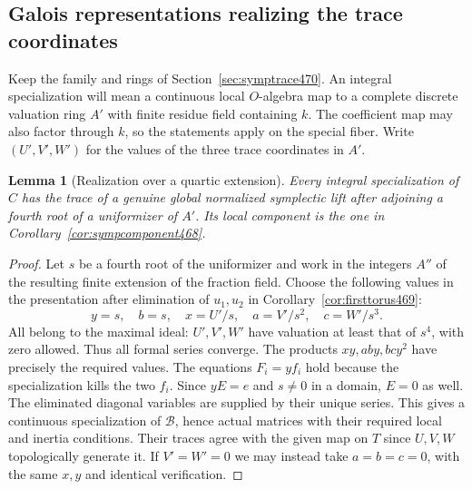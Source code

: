 \documentclass[a4paper,11pt]{article}
\newtheorem{lemma}[proposition]{Lemma}
\theoremstyle{definition}
\theoremstyle{remark}
\numberwithin{equation}{section}
\begin{document}
\subsection{Galois representations realizing the trace coordinates}
\label{sec:tracereps473}

Keep the family and rings of Section~\ref{sec:symptrace470}.
An integral specialization will mean a continuous local \(O\)-algebra
map to a complete discrete valuation ring \(A'\) with finite residue
field containing \(k\). The coefficient map may also factor through
\(k\), so the statements apply on the special fiber. Write
\((U',V',W')\) for the values of the three trace coordinates in \(A'\).

\begin{lemma}[Realization over a quartic extension]\leavevmode
\label{lem:realizetrace473}
Every integral specialization of \(C\) has the trace of a genuine
global normalized symplectic lift after adjoining a fourth root of
a uniformizer of \(A'\). Its local component is the one in
Corollary~\ref{cor:sympcomponent468}.
\end{lemma}
\begin{proof}
Let \(s\) be a fourth root of the uniformizer and work in the
integers \(A''\) of the resulting finite extension of the fraction
field. Choose the following values in the presentation after
elimination of \(u_1,u_2\) in Corollary~\ref{cor:firsttorus469}:
\[
             y=s,\quad b=s,\quad x=U'/s,\quad
                     a=V'/s^2,\quad c=W'/s^3 .
\]
All belong to the maximal ideal: \(U',V',W'\) have valuation at
least that of \(s^4\), with zero allowed. Thus all formal series
converge. The products \(xy,aby,bcy^2\) have precisely the
required values. The equations \(F_i=y f_i\) hold because the
specialization kills the two \(f_i\). Since \(yE=e\) and \(s\ne0\)
in a domain, \(E=0\) as well. The eliminated diagonal variables
are supplied by their unique series. This gives a continuous
specialization of \(\mathcal B\), hence actual matrices with their
required local and inertia conditions. Their traces agree with
the given map on \(T\) since \(U,V,W\) topologically generate it.
If \(V'=W'=0\) we may instead take \(a=b=c=0\), with the same
\(x,y\) and identical verification.
\end{proof}
\end{document}
